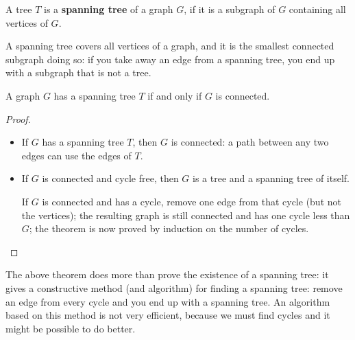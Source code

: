  \begin{definition}
A tree \textup{$T$ is a \textbf{spanning tree} of a graph $G$,
if it is a subgraph of $G$ containing all vertices of $G$.}
\end{definition}

A spanning tree covers all vertices of a graph, and it is the smallest
connected subgraph doing so: if you take away an edge from a spanning
tree, you end up with a subgraph that is not a tree.

 \begin{theorem}
A graph $G$ has a spanning tree $T$ if and only if $G$ is connected.
\end{theorem}
\begin{proof}
~\\
\begin{itemize}
\item
If $G$ has a spanning tree $T$, then $G$ is connected: a path between
any two edges can use the edges of $T$.

\item
If $G$ is connected and cycle free, then $G$ is a tree and a spanning
tree of itself.

If $G$ is connected and has a cycle, remove one edge from that cycle
(but not the vertices); the resulting graph is still connected and has
one cycle less than $G$; the theorem is now proved by induction on the
number of cycles.
\end{itemize}
\end{proof}

The above theorem does more than prove the existence of a spanning
tree: it gives a constructive method (and algorithm) for finding a
spanning tree: remove an edge from every cycle and you end up with a
spanning tree. An algorithm based on this method is not very
efficient, because we must find cycles and it might be possible to do
better.

